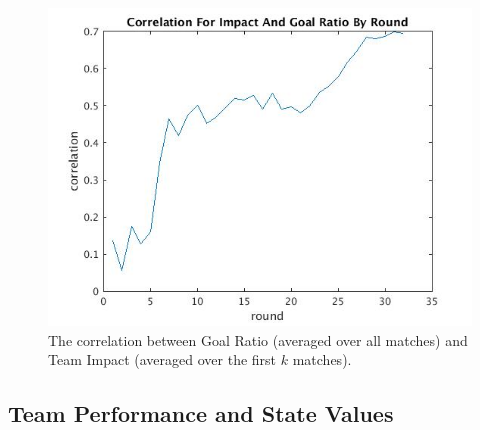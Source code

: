 

\begin{figure}
\centering 
\includegraphics[width=1\textwidth]{correlation-by-round}
\caption{The correlation between Goal Ratio (averaged over all matches) and Team Impact (averaged over the first $k$ matches).}
\label{fig:rounds}
\end{figure}

\subsection{Team Performance and State Values}

